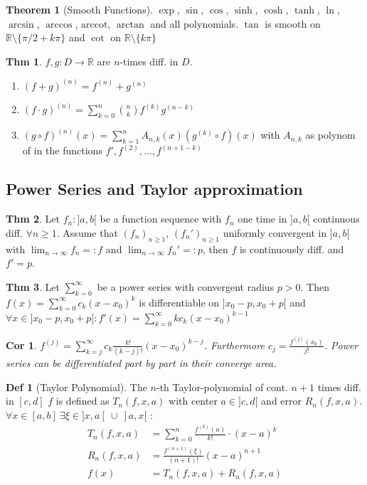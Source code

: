 \documentclass[a4paper, 10pt]{article}
\newtheorem*{corollary}{Cor}
\theoremstyle{definition}
\newtheorem*{theorem}{Thm}
\newtheorem*{definition}{Def}
\theoremstyle{named}
\newtheorem*{ntheorem_wrapper}{Theorem}
\newenvironment{ntheorem}%
    {\begin{mdframed}[style=important]\begin{ntheorem_wrapper}}%
    {\end{ntheorem_wrapper}\end{mdframed}}
\newcommand{\R}{\mathbb{R}}
\begin{document}
\begin{ntheorem}[Smooth Functions]
    $\exp$, $\sin$, $\cos$, $\sinh$, $\cosh$, $\tanh$, $\ln$, $\arcsin$, $\arccos$, $\text{arccot}$, $\arctan$ and all polynomials. $\tan$ is smooth on $\R \setminus \{\pi / 2 + k \pi\}$ and $\cot$ on $\R \setminus\{k\pi\}$
\end{ntheorem}

\begin{theorem}
    $f, g: D \to \R$ are $n$-times diff. in $D$.
    \begin{enumerate}
        \item $(f + g)^{(n)} = f^{(n)} + g^{(n)}$
        \item $(f \cdot g)^{(n)} = \sum_{k = 0}^n \binom{n}{k}f^{(k)}g^{(n-k)}$
        \item $(g \circ f)^{(n)}(x) = \sum_{k=1}^n A_{n,k}(x)(g^{(k)} \circ f)(x)$ with $A_{n,k}$ as polynom of in the functions $f', f^{(2)}, \ldots, f^{(n+1-k)}$
    \end{enumerate}
\end{theorem}

\subsection{Power Series and Taylor approximation}
\begin{theorem}
    Let $f_n : ]a, b[$ be a function sequence with $f_n$ one time in $]a, b[$ continuous diff. $\forall n \geq 1$. Assume that $(f_n)_{n \geq 1}$, $(f_n')_{n \geq 1}$ uniformly convergent in $]a, b[$ with $\lim_{n \to \infty} f_n =: f$ and $\lim_{n \to \infty} f_n' =: p$, then $f$ is continuously diff. and $f' = p$.
\end{theorem}

\begin{theorem}
    Let $\sum_{k = 0}^\infty$ be a power series with convergent radius $p > 0$. Then $f(x) = \sum_{k = 0}^\infty c_k(x - x_0)^k$ is differentiable on $]x_0 - p , x_0 + p[$ and $\forall x \in ]x_0 - p , x_0 + p[: f'(x) = \sum_{k = 0}^\infty kc_k(x - x_0)^{k - 1}$
\end{theorem}
\begin{corollary}
    $f^(j) = \sum_{k = j}^\infty c_k \frac{k!}{(k-j)!}(x - x_0)^{k - j}$. Furthermore $c_j = \frac{f^(j)(x_0)}{j!}$. Power series can be differentiated part by part in their converge area.
\end{corollary}

\begin{definition}[Taylor Polynomial]
    The $n$-th Taylor-polynomial of cont. $n + 1$ times diff. in $[c, d]$ $f$ is defined as $T_n(f, x, a)$ with center $a \in ]c, d[$ and error $R_n(f, x, a)$. $\forall x \in [a, b] \ \exists \xi \in ]x, a[ \ \cup \ ]a, x[$ : 
    \begin{align*}
        T_n(f, x, a) &= \sum_{k = 0}^n \frac{f^{(k)}(a)}{k!} \cdot (x - a)^k \\
        R_n(f, x, a) &= \frac{f^(n+1)(\xi)}{(n + 1)!}(x-a)^{n+1} \\
        f(x) &= T_n(f, x, a) + R_n(f, x, a)
    \end{align*}
\end{definition}
\end{document}
